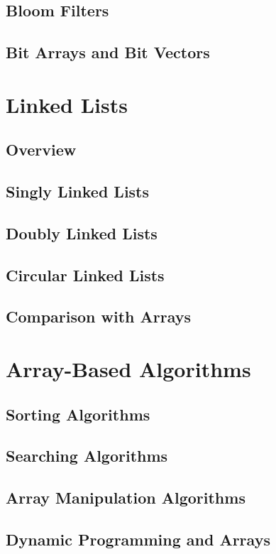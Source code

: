 \documentclass[12pt, oneside]{book}
\begin{document}
	\section{Bloom Filters}
	\section{Bit Arrays and Bit Vectors}
	
	\chapter{Linked Lists}
	\section{Overview}
	\section{Singly Linked Lists}
	\section{Doubly Linked Lists}
	\section{Circular Linked Lists}
	\section{Comparison with Arrays}
	
	\chapter{Array-Based Algorithms}
	\section{Sorting Algorithms}
	\section{Searching Algorithms}
	\section{Array Manipulation Algorithms}
	\section{Dynamic Programming and Arrays}
	
\end{document}
